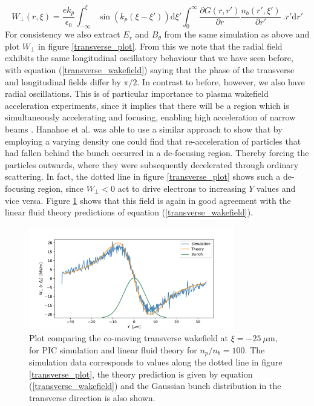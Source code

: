 \begin{equation}
W_{\perp}(r,\xi)=\frac{e k_p}{\epsilon_0} \int_{-\infty}^{\xi} \sin(k_p(\xi-\xi'))\mathrm{d}\xi' \int_{0}^{\infty}\frac{\partial G\left(r,r'\right)}{\partial r} \frac{n_b(r',\xi')}{\partial r'}~.
r'\mathrm{d}r'
\label{transverse_wakefield}
\end{equation}
For consistency we also extract $E_r$ and $B_{\theta}$ from the same simulation as above and plot $W_{\perp}$ in figure \ref{transverse_plot}.  From this we note that the radial field exhibits the same longitudinal oscillatory behaviour that we have seen before, with equation (\ref{transverse_wakefield}) saying that the phase of the transverse and longitudinal fields differ by $\pi/2$. In contrast to before, however, we also have radial oscillations. This is of particular importance to plasma wakefield acceleration experiments, since it implies that there will be a region which is simultaneously accelerating and focusing, enabling high acceleration of narrow beams \cite{Esarey2009}. Hanahoe et al. \cite{Hanahoe2017} was able to use a similar approach to show that by employing a varying density one could find that re-acceleration of particles that had fallen behind the bunch occurred in a de-focusing region. Thereby forcing the particles outwards, where they were subsequently decelerated through ordinary scattering. In fact, the dotted line in figure \ref{transverse_plot} shows such a de-focusing region, since $W_{\perp}<0$ act to drive electrons to increasing $Y$ values and vice versa.  Figure \ref{theory_vs_simulation_transverse} shows that this field is again in good agreement with the linear fluid theory predictions of equation (\ref{transverse_wakefield}).
\begin{figure}
\centering
\includegraphics[width=0.8\textwidth]{test.pdf}
\caption{\small{Plot comparing the co-moving transverse wakefield at $\xi=-25 ~\mu\text{m}$, for PIC simulation and linear fluid theory for $n_p/n_b=100$. The simulation data corresponds to values along the dotted line in figure \ref{transverse_plot}, the theory prediction is given by equation  (\ref{transverse_wakefield}) and the Gaussian bunch distribution in the transverse direction is also shown.}}
\label{theory_vs_simulation_transverse}
\end{figure}


